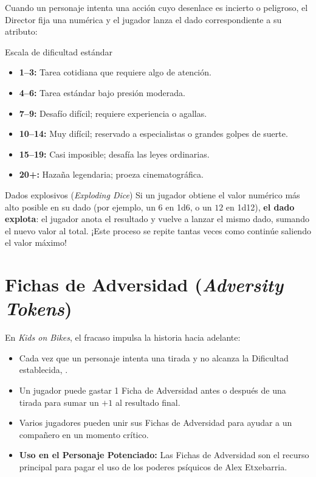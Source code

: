 Cuando un personaje intenta una acción cuyo desenlace es incierto o peligroso, el Director fija una  numérica y el jugador lanza el dado correspondiente a su atributo:

\begin{CajaRegla}{Escala de dificultad estándar}
\begin{itemize}
  \item \textbf{1--3:} Tarea cotidiana que requiere algo de atención.
  \item \textbf{4--6:} Tarea estándar bajo presión moderada.
  \item \textbf{7--9:} Desafío difícil; requiere experiencia o agallas.
  \item \textbf{10--14:} Muy difícil; reservado a especialistas o grandes golpes de suerte.
  \item \textbf{15--19:} Casi imposible; desafía las leyes ordinarias.
  \item \textbf{20+:} Hazaña legendaria; proeza cinematográfica.
\end{itemize}
\end{CajaRegla}

\begin{CajaRegla}{Dados explosivos (\emph{Exploding Dice})}
Si un jugador obtiene el valor numérico más alto posible en su dado (por ejemplo, un $6$ en 1d6, o un $12$ en 1d12), \textbf{el dado explota}: el jugador anota el resultado y vuelve a lanzar el mismo dado, sumando el nuevo valor al total. ¡Este proceso se repite tantas veces como continúe saliendo el valor máximo!
\end{CajaRegla}

\section{Fichas de Adversidad (\emph{Adversity Tokens})}

En \emph{Kids on Bikes}, el fracaso impulsa la historia hacia adelante:
\begin{itemize}
  \item Cada vez que un personaje intenta una tirada y no alcanza la Dificultad establecida, .
  \item Un jugador puede gastar 1 Ficha de Adversidad antes o después de una tirada para sumar un $+1$ al resultado final.
  \item Varios jugadores pueden unir sus Fichas de Adversidad para ayudar a un compañero en un momento crítico.
  \item \textbf{Uso en el Personaje Potenciado:} Las Fichas de Adversidad son el recurso principal para pagar el uso de los poderes psíquicos de Alex Etxebarria.
\end{itemize}

